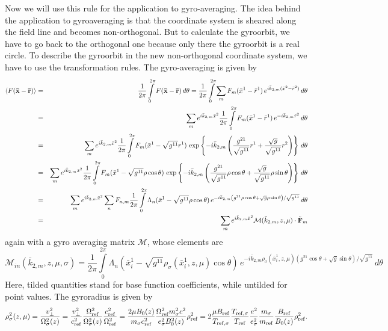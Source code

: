 Now we will use this rule for the application to gyro-averaging.
The idea behind the application to gyroaveraging is that the
coordinate system is sheared along the field line and becomes
non-orthogonal. But to calculate the gyroorbit, we have to go back to
the orthogonal one because only there the gyroorbit is a real
circle. To describe the gyroorbit in the new non-orthogonal 
coordinate system, we have to use the transformation rules. The
gyro-averaging is given by
\begin{eqnarray*}
  \avg{F(\mathbf{\bar x}-\mathbf{\bar r})} 
  &=& \frac{1}{2\pi}\int\limits_0^{2\pi} F(\mathbf{\bar
    x}-\mathbf{\bar r})\,d\theta
  = \frac{1}{2\pi}\int\limits_0^{2\pi} \sum_m
  F_m(\bar x^1-\bar r^1)\,e^{i\bar k_{2,m}(\bar x^2-\bar r^2)}\,d\theta\\
  &=& \sum_m e^{i\bar k_{2,m}\bar x^2} \frac{1}{2\pi}\int\limits_0^{2\pi} 
  F_m(\bar x^1-\bar r^1)\,e^{-i\bar k_{2,m} \bar r^2}\,d\theta\\
  &=& \sum_m e^{i\bar k_{2,m}\bar x^2} \frac{1}{2\pi}\int\limits_0^{2\pi} 
  F_m(\bar x^1-\sqrt{g^{11}} r^1)\,\exp\left\{
    -i\bar k_{2,m} \left(
      \frac{g^{21}}{\sqrt{g^{11}}} r^1 
      +\frac{\sqrt{g}}{\sqrt{g^{11}}} r^2
    \right)
  \right\}\,d\theta\\
  &=& \sum_m e^{i\bar k_{2,m}\bar x^2} \frac{1}{2\pi}\int\limits_0^{2\pi} 
  F_m(\bar x^1-\sqrt{g^{11}} \rho\cos\theta)\,\exp\left\{
    -i\bar k_{2,m} \left(
      \frac{g^{21}}{\sqrt{g^{11}}} \rho\cos\theta
      +\frac{\sqrt{g}}{\sqrt{g^{11}}} \rho\sin\theta
    \right)
  \right\}\,d\theta\\
  &=& \sum_m e^{i\bar k_{2,m}\bar x^2} \sum_n
  F_{n,m}\frac{1}{2\pi}\int\limits_0^{2\pi} 
  \Lambda_n(\bar x^1-\sqrt{g^{11}} \rho\cos\theta)\,e^{
    -i\bar k_{2,m} \left(
      g^{21} \rho\cos\theta
      +\sqrt{g} \rho\sin\theta
    \right)/\sqrt{g^{11}}
  }\,d\theta\\
  &=& \sum_m e^{i\bar k_{2,m}\bar x^2} \mathcal{M}(\bar{k}_{2,m},z,\mu)\cdot\tilde{\mathbf{F}}_m
\end{eqnarray*}
again with a gyro averaging matrix $\mathcal{M}$, whose elements are
\begin{displaymath}
  \mathcal{M}_{in}(\bar{k}_{2,m},z,\mu,\sigma)=\frac{1}{2\pi}\int\limits_0^{2\pi} 
  \Lambda_n(\bar x^1_i-\sqrt{g^{11}} \rho_\sigma(\bar{x}^1_i,z,\mu)\cos\theta)\,e^{
    -i\bar k_{2,m} \rho_\sigma(\bar{x}^1_i,z,\mu)\left(
      g^{21} \cos\theta
      +\sqrt{g} \sin\theta
    \right)/\sqrt{g^{11}}
  }\,d\theta
\end{displaymath}
Here, tilded quantities stand for base function coefficients, while untilded
for point values. The gyroradius is given by
\begin{displaymath}
  \rho_\sigma^2(z,\mu)=\frac{v_\bot^2}{\Omega_\sigma^2(z)}
  =\frac{v_\bot^2}{c_\rf^2}\frac{\Omega_\rf^2}{\Omega_\sigma^2(z)}\frac{c_\rf^2}{\Omega_\rf^2}
  =\frac{2\mu B_0(z)}{m_\sigma c_\rf^2}\frac{\Omega_\rf^2m_\sigma^2c^2}{e_\sigma^2B_0^2(z)}\rho_\rf^2
  =2\frac{\mu B_\rf}{\refj[\sigma]{T}}\frac{\refj[\sigma]{T}}{T_\rf} \frac{e^2}{e_\sigma^2} \frac{m_\sigma}{m_\rf}
  \frac{B_\rf}{B_0(z)}\rho_\rf^2.
\end{displaymath}


